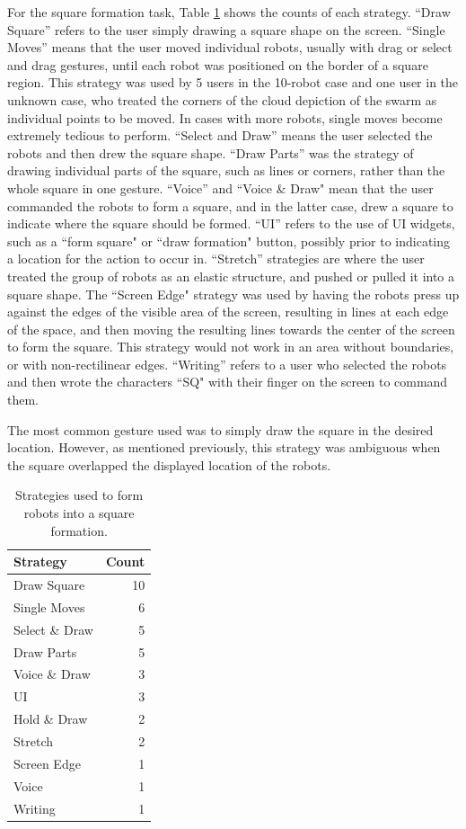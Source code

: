 For the square formation task, Table \ref{tab:square_strategies} shows the counts of each strategy. 
``Draw Square'' refers to the user simply drawing a square shape on the screen. 
``Single Moves'' means that the user moved individual robots, usually with drag or select and drag gestures, until each robot was positioned on the border of a square region. 
This strategy was used by 5 users in the 10-robot case and one user in the unknown case, who treated the corners of the cloud depiction of the swarm as individual points to be moved. 
In cases with more robots, single moves become extremely tedious to perform. 
``Select and Draw'' means the user selected the robots and then drew the square shape. 
``Draw Parts'' was the strategy of drawing individual parts of the square, such as lines or corners, rather than the whole square in one gesture. 
``Voice'' and ``Voice \& Draw" mean that the user commanded the robots to form a square, and in the latter case, drew a square to indicate where the square should be formed.
``UI'' refers to the use of UI widgets, such as a ``form square" or ``draw formation" button, possibly prior to indicating a location for the action to occur in. 
``Stretch'' strategies are where the user treated the group of robots as an elastic structure, and pushed or pulled it into a square shape.
The ``Screen Edge" strategy was used by having the robots press up against the edges of the visible area of the screen, resulting in lines at each edge of the space, and then moving the resulting lines towards the center of the screen to form the square. 
This strategy would not work in an area without boundaries, or with non-rectilinear edges. 
``Writing'' refers to a user who selected the robots and then wrote the characters ``SQ" with their finger on the screen to command them. 

The most common gesture used was to simply draw the square in the desired location. 
However, as mentioned previously, this strategy was ambiguous when the square overlapped the displayed location of the robots.

\begin{table}
\centering
	\begin{tabular}{l r}
		Strategy & Count\\
		\hline
		Draw Square & 10\\
		Single Moves & 6\\
		Select \& Draw & 5\\
		Draw Parts & 5 \\
		Voice \& Draw & 3\\
		UI & 3\\
		Hold \& Draw & 2\\
		Stretch & 2\\
		Screen Edge & 1\\
		Voice & 1\\
		Writing & 1\\
	\end{tabular}
	\caption{Strategies used to form robots into a square formation.}
	\label{tab:square_strategies}
\end{table}

